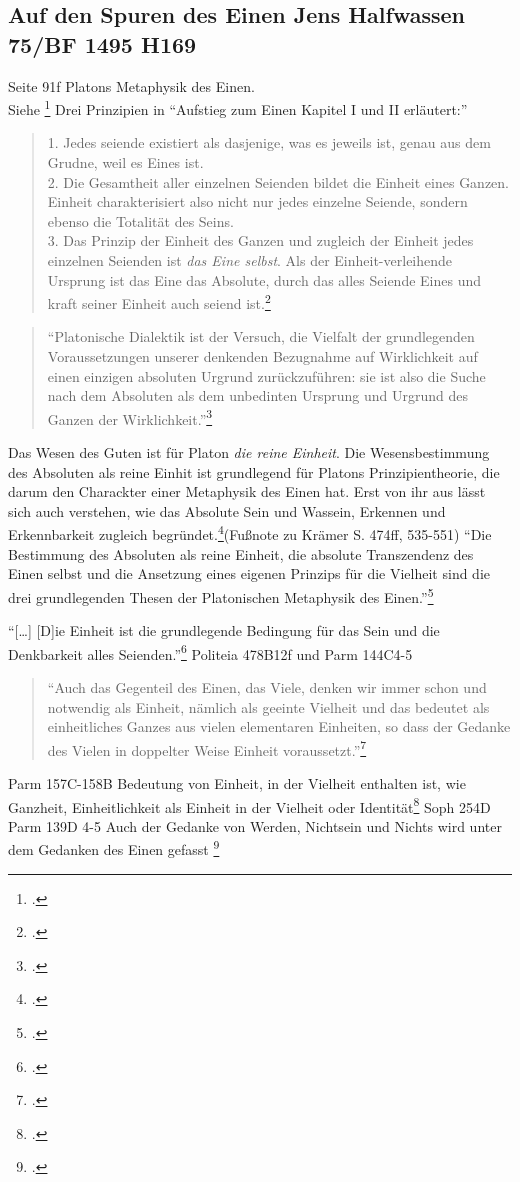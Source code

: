 \documentclass[12pt]{article}
\newcommand*{\zitatblock}[1]{%
    \begin{quote}
    \fontsize{10}{12}\selectfont
    \setlength{\parskip}{1.0em}
    #1
    \end{quote}
}
\begin{document}
\subsection*{Auf den Spuren des Einen Jens Halfwassen  75/BF 1495 H169}
Seite 91f Platons Metaphysik des Einen.\\
Siehe \footcite[][]{halfwassen2015spuren}
Drei Prinzipien in \enquote{Aufstieg zum Einen Kapitel I und II erläutert:} \zitatblock{1. Jedes seiende existiert als dasjenige, was es jeweils ist, genau aus dem Grudne, weil es Eines ist.\\2. Die Gesamtheit aller einzelnen Seienden bildet die Einheit eines Ganzen. Einheit charakterisiert also nicht nur jedes einzelne Seiende, sondern ebenso die Totalität des Seins.\\3. Das Prinzip der Einheit des Ganzen und zugleich der Einheit jedes einzelnen Seienden ist \emph{das Eine selbst}. Als der Einheit-verleihende Ursprung ist das Eine das Absolute, durch das alles Seiende Eines und kraft seiner Einheit auch seiend ist.\footcite[][S. 91]{halfwassen2015spuren}}

\zitatblock{\enquote{Platonische Dialektik ist der Versuch, die Vielfalt der grundlegenden Voraussetzungen unserer denkenden Bezugnahme auf Wirklichkeit auf einen einzigen absoluten Urgrund zurückzuführen: sie ist also die Suche nach dem Absoluten als dem unbedinten Ursprung und Urgrund des Ganzen der Wirklichkeit.}\footcite[][S. 95]{halfwassen2015spuren}}
Das Wesen des Guten ist für Platon \emph{die reine Einheit}. Die Wesensbestimmung des Absoluten als reine Einhit ist grundlegend für Platons Prinzipientheorie, die darum den Charackter einer Metaphysik des Einen hat. Erst von ihr aus lässt sich auch verstehen, wie das Absolute Sein und Wassein, Erkennen und Erkennbarkeit zugleich begründet.\footcite[][S. 96]{halfwassen2015spuren}(Fußnote zu Krämer S. 474ff, 535-551)
\enquote{Die Bestimmung des Absoluten als reine Einheit, die absolute Transzendenz des Einen selbst und die Ansetzung eines eigenen Prinzips für die Vielheit sind die drei grundlegenden Thesen der Platonischen Metaphysik des Einen.}\footcite[][S. 96]{halfwassen2015spuren}

\enquote{[\dots] [D]ie Einheit ist die grundlegende Bedingung für das Sein und die Denkbarkeit alles Seienden.}\footcite[vgl.][S. 97]{halfwassen2015spuren} Politeia 478B12f und Parm 144C4-5
\zitatblock{\enquote{Auch das Gegenteil des Einen, das Viele, denken wir immer schon und notwendig als Einheit, nämlich als geeinte Vielheit und das bedeutet als einheitliches Ganzes aus vielen elementaren Einheiten, so dass der Gedanke des Vielen in doppelter Weise Einheit voraussetzt.}\footcite[][S. 97]{halfwassen2015spuren}} Parm 157C-158B
Bedeutung von Einheit, in der Vielheit enthalten ist, wie Ganzheit, Einheitlichkeit als Einheit in der Vielheit oder Identität\footcite[vgl.][S. 97]{halfwassen2015spuren} Soph 254D Parm 139D 4-5
Auch der Gedanke von Werden, Nichtsein und Nichts wird unter dem Gedanken des Einen gefasst \footcite[vgl.][S. 97]{halfwassen2015spuren}
\end{document}
